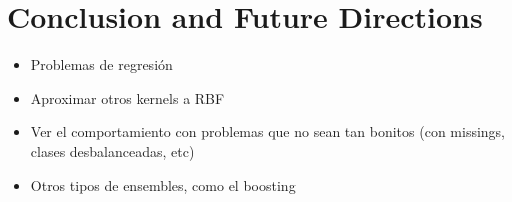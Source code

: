 
\chapter{Conclusion and Future Directions} %

\label{Chapter5} %


\begin{note}
  \begin{itemize}
    \item Problemas de regresión
    \item Aproximar otros kernels a RBF
    \item Ver el comportamiento con problemas que no sean tan bonitos (con
    missings, clases desbalanceadas, etc)
    \item Otros tipos de ensembles, como el boosting
  \end{itemize}
\end{note}
